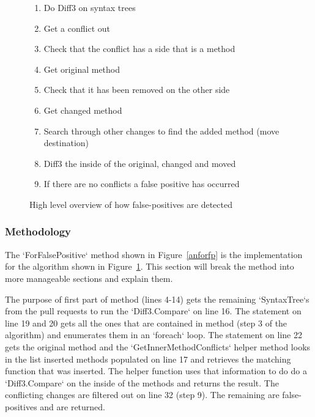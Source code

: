 \documentclass[draftclsnofoot,onecolumn]{IEEEtran}
\begin{document}
\begin{figure}[!t]
\centering
\begin{enumerate}
\item Do Diff3 on syntax trees
\item Get a conflict out
\item Check that the conflict has a side that is a method
\item Get original method
\item Check that it has been removed on the other side
\item Get changed method
\item Search through other changes to find the added method (move destination)
\item Diff3 the inside of the original, changed and moved
\item If there are no conflicts a false positive has occurred
\end{enumerate}
\caption{High level overview of how false-positives are detected}
\label{fpalgore}
\end{figure}

\subsubsection{Methodology}
The `ForFalsePositive` method shown in Figure~\ref{anforfp} is the 
implementation for the algorithm shown in Figure~\ref{fpalgore}. This 
section will break the method into more manageable sections and explain them.

The purpose of first part of method (lines 4-14) gets the remaining 
`SyntaxTree`s from the pull requests to run the `Diff3.Compare` on line 16. 
The statement on line 19 and 20 gets all the ones that are contained in 
method (step 3 of the algorithm) and enumerates them in an `foreach` loop. 
The statement on line 22 gets the original method and the 
`GetInnerMethodConflicts` helper method looks in the list inserted methods 
populated on line 17 and retrieves the matching function that was inserted. 
The helper function uses that information to do do a `Diff3.Compare` on the 
inside of the methods and returns the result. The conflicting changes are 
filtered out on line 32 (step 9). The remaining are false-positives and are 
returned.
\end{document}
